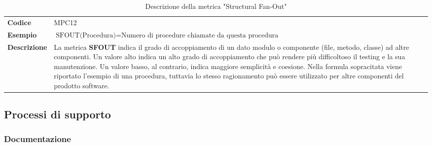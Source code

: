 \documentclass[a4paper,12pt]{article}
\begin{document}
{            {\renewcommand{\arraystretch}{1.4}
                \begin{table}[H]
                \centering
                \begin{tabularx}{\textwidth}{|l|X|}
                    \hline
                    \rowcolor{gold}
                    \multicolumn{2}{|c|}{\textbf{Structural Fan-Out(SFOUT)}}\\
                    \hline
                    \textbf{Codice} & MPC12 \\
                    \hline
                    \textbf{Esempio} & \( \displaystyle \text{SFOUT(Procedura)} = \text{Numero di procedure chiamate da questa procedura} \)\\
                    \hline
                    \textbf{Descrizione} & La metrica \textbf{SFOUT} indica il grado di accoppiamento di un dato modulo o componente (file, metodo, classe) ad altre componenti. Un valore alto indica un alto grado di accoppiamento che può rendere più difficoltoso il testing e la sua manutenzione. Un valore basso, al contrario, indica maggiore semplicità e coesione. Nella formula sopracitata viene riportato l'esempio di una procedura, tuttavia lo stesso ragionamento può essere utilizzato per altre componenti del prodotto software.\\
                    \hline
                \end{tabularx}      
                \caption{Descrizione della metrica "Structural Fan-Out"}
                \end{table}
            }
        }
        
    \subsection{Processi di supporto}

        \subsubsection{Documentazione}
        
\end{document}
